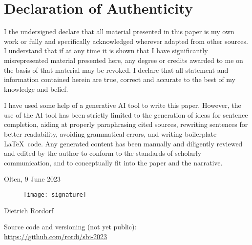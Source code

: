 \vspace*{3cm}

\section*{Declaration of Authenticity}

I the undersigned declare that all material presented in this paper is my own work or fully
and specifically acknowledged wherever adapted from other sources. I understand that if at any
time it is shown that I have significantly misrepresented material presented here, any degree or
credits awarded to me on the basis of that material may be revoked. I declare that all statement
and information contained herein are true, correct and accurate to the best of my knowledge and
belief.

\vspace*{0.4cm} 

I have used some help of a generative AI tool to write this paper. However, the use of the AI
tool has been strictly limited to the generation of ideas for sentence completion, aiding at properly
paraphrasing cited sources, rewriting sentences for better readability, avoiding grammatical errors,
and writing boilerplate \LaTeX\ code. Any generated content has been manually and diligently reviewed
and edited by the author to conform to the standards of scholarly communication, and to conceptually
fit into the paper and the narrative.

\vspace*{1cm} 
\noindent Olten, 9 June 2023

\begin{figure}[h!]
    \texttt{[image: signature]}
\end{figure}
\noindent Dietrich Rordorf

\vspace*{2cm} 

\noindent Source code and versioning (not yet public):\\
\url{https://github.com/rordi/sbi-2023} 


